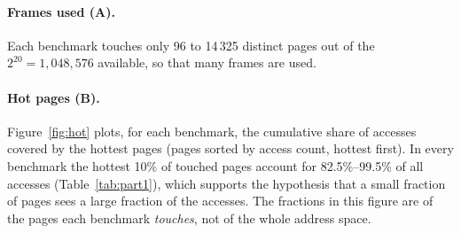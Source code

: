 \documentclass[11pt,a4paper]{article}
\begin{document}
\paragraph{Frames used (A).} Each benchmark touches only 96 to 14\,325 distinct pages out of the $2^{20}=1{,}048{,}576$ available, so that many frames are used.

\paragraph{Hot pages (B).} Figure~\ref{fig:hot} plots, for each benchmark, the cumulative share of accesses covered by the hottest pages (pages sorted by access count, hottest first). In every benchmark the hottest 10\% of touched pages account for 82.5\%--99.5\% of all accesses (Table~\ref{tab:part1}), which supports the hypothesis that a small fraction of pages sees a large fraction of the accesses. The fractions in this figure are of the pages each benchmark \emph{touches}, not of the whole address space.
\end{document}
